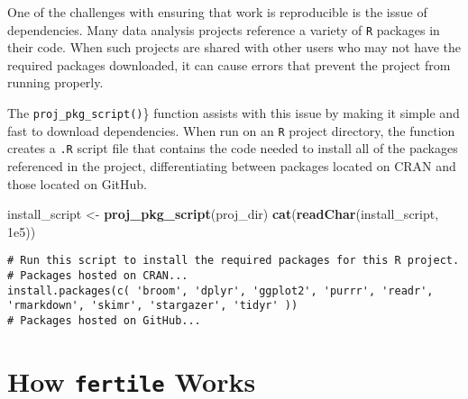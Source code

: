 \documentclass[12pt,twoside]{reedthesis}
\newenvironment{Shaded}{\begin{snugshade}}{\end{snugshade}}
\newcommand{\KeywordTok}[1]{\textcolor[rgb]{0.13,0.29,0.53}{\textbf{#1}}}
\newcommand{\FloatTok}[1]{\textcolor[rgb]{0.00,0.00,0.81}{#1}}
\newcommand{\StringTok}[1]{\textcolor[rgb]{0.31,0.60,0.02}{#1}}
\newcommand{\NormalTok}[1]{#1}
\begin{document}
One of the challenges with ensuring that work is reproducible is the
issue of dependencies. Many data analysis projects reference a variety
of \texttt{R} packages in their code. When such projects are shared with
other users who may not have the required packages downloaded, it can
cause errors that prevent the project from running properly.

The \texttt{proj\_pkg\_script()}\} function assists with this issue by
making it simple and fast to download dependencies. When run on an
\texttt{R} project directory, the function creates a \texttt{.R} script
file that contains the code needed to install all of the packages
referenced in the project, differentiating between packages located on
CRAN and those located on GitHub.
\begin{Shaded}
\begin{Highlighting}[]
\NormalTok{install_script <-}\StringTok{ }\KeywordTok{proj_pkg_script}\NormalTok{(proj_dir)}
\KeywordTok{cat}\NormalTok{(}\KeywordTok{readChar}\NormalTok{(install_script, }\FloatTok{1e5}\NormalTok{))}
\end{Highlighting}
\end{Shaded}
\begin{verbatim}
# Run this script to install the required packages for this R project.
# Packages hosted on CRAN...
install.packages(c( 'broom', 'dplyr', 'ggplot2', 'purrr', 'readr', 'rmarkdown', 'skimr', 'stargazer', 'tidyr' ))
# Packages hosted on GitHub...
\end{verbatim}
\section{\texorpdfstring{How \texttt{fertile}
Works}{How fertile Works}}\label{how-fertile-works}
\end{document}
